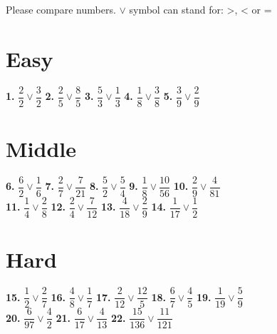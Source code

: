 \documentclass[a4paper]{article}
\begin{document}
{\large Please compare numbers. $\vee$ symbol can stand for: >, < or =}	
		
\section* {\Large Easy}
		
\Large {
\textbf{1.} $\dfrac{2}{2}\vee\dfrac{3}{2}$ \hspace{0.25cm}
\textbf{2.} $\dfrac{2}{5}\vee\dfrac{8}{5}$ \hspace{0.25cm}
\textbf{3.} $\dfrac{5}{3}\vee\dfrac{1}{3}$ \hspace{0.25cm}
\textbf{4.} $\dfrac{1}{8}\vee\dfrac{3}{8}$ \hspace{0.25cm}
\textbf{5.} $\dfrac{3}{9}\vee\dfrac{2}{9}$
}
		
\section* {\Large Middle}
		
\Large {
\textbf{6.} $\dfrac{6}{2}\vee\dfrac{1}{6}$ \hspace{0.25cm}
\textbf{7.} $\dfrac{2}{7}\vee\dfrac{7}{21}$ \hspace{0.25cm}
\textbf{8.} $\dfrac{5}{2}\vee\dfrac{5}{4}$ \hspace{0.25cm}
\textbf{9.} $\dfrac{1}{8}\vee\dfrac{10}{56}$ \hspace{0.25cm}
\textbf{10.} $\dfrac{2}{9}\vee\dfrac{4}{81}$ \\ [0.25cm]
\textbf{11.} $\dfrac{1}{4}\vee\dfrac{2}{8}$ \hspace{0.25cm}
\textbf{12.} $\dfrac{2}{4}\vee\dfrac{7}{12}$ \hspace{0.25cm}
\textbf{13.} $\dfrac{4}{18}\vee\dfrac{2}{9}$ \hspace{0.25cm}
\textbf{14.} $\dfrac{1}{17}\vee\dfrac{1}{2}$
}
		
\section* {\Large Hard}

\Large {
\textbf{15.} $\dfrac{1}{2}\vee\dfrac{2}{7}$ \hspace{0.25cm}
\textbf{16.} $\dfrac{4}{8}\vee\dfrac{1}{7}$ \hspace{0.25cm}
\textbf{17.} $\dfrac{2}{12}\vee\dfrac{12}{5}$ \hspace{0.25cm}
\textbf{18.} $\dfrac{6}{7}\vee\dfrac{4}{5}$  \hspace{0.25cm}
\textbf{19.} $\dfrac{1}{19}\vee\dfrac{5}{9}$ \\[0.25cm]
\textbf{20.} $\dfrac{6}{97}\vee\dfrac{4}{2}$ \hspace{0.25cm}
\textbf{21.} $\dfrac{6}{17}\vee\dfrac{4}{13}$ \hspace{0.25cm}
\textbf{22.} $\dfrac{15}{136}\vee\dfrac{11}{121}$
}
\end{document}
